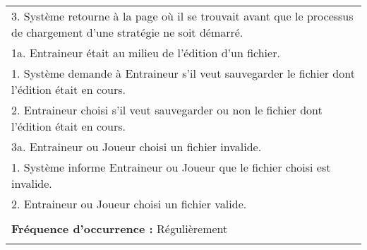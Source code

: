\begin{longtable}{|p{16cm}|}
	\hspace{1cm}3. Système retourne à la page où il se trouvait avant que le processus de chargement d'une stratégie ne soit démarré.\\
	1a. Entraineur était au milieu de l'édition d'un fichier.\\
	\hspace{1cm}1. Système demande à Entraineur s'il veut sauvegarder le fichier dont l'édition était en cours.\\
	\hspace{1cm}2. Entraineur choisi s'il veut sauvegarder ou non le fichier dont l'édition était en cours.\\
	3a. Entraineur ou Joueur choisi un fichier invalide.\\
	\hspace{1cm}1. Système informe Entraineur ou Joueur que le fichier choisi est invalide.\\
	\hspace{1cm}2. Entraineur ou Joueur choisi un fichier valide.\\
	\\
	\textbf{Fréquence d'occurrence :} Régulièrement\\
	\\
	\hline
\end{longtable}

